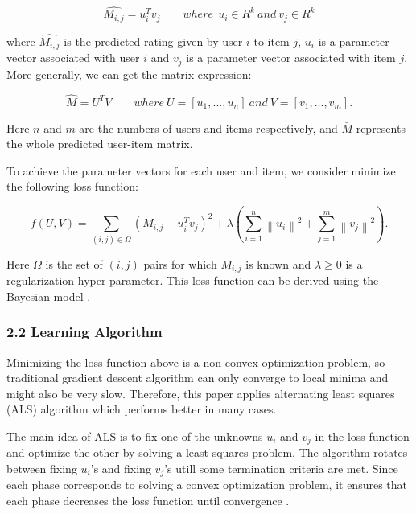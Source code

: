 \documentclass{article}
\begin{document}
\begin{equation}
	\hat{M_{i,j}}=u_{i}^{T}v_{j} \qquad where\ \ u_{i}\in R^{k}\ and\ v_{j}\in R^{k}
\end{equation}



\noindent where $\hat{M_{i,j}}$ is the predicted rating given by user $i$ to item $j$, $u_{i}$ is a parameter 
vector associated with user $i$ and $v_{j}$ is a parameter vector associated with item $j$. More generally, 
we can get the matrix expression:

\begin{equation}
	\hat{M} = U^{T}V \qquad where\ U=\left [ u_{1},...,u_{n} \right ]\ and\ V=\left [ v_{1},...,v_{m} \right ].
\end{equation}

\noindent Here $n$ and $m$ are the numbers of users and items respectively, and $\bar{M}$ represents the 
whole predicted user-item matrix.

\indent To achieve the parameter vectors for each user and item, we consider minimize the 
following loss function:

\begin{equation}
	f\left ( U,V \right )=\sum_{\left ( i,j \right )\in \Omega }^{}\left ( M_{i,j} - u_{i}^{T}v_{j}\right )^{2}+\lambda \left ( \sum_{i=1}^{n}\left \| u_{i} \right \|^{2}+\sum_{j=1}^{m}\left \| v_{j} \right \|^{2} \right ).
\end{equation}

\noindent Here $\Omega$ is the set of $\left ( i,j \right )$ pairs for which $M_{i,j}$ is known and $\lambda \geq 0$ is a 
regularization hyper-parameter. This loss function can be derived using the Bayesian model \cite{st446lecturenotes}.

\subsubsection*{2.2  Learning Algorithm}


\noindent Minimizing the loss function above is a non-convex optimization problem, so traditional 
gradient descent algorithm can only converge to local minima and might also be very slow. Therefore, 
this paper applies alternating least squares (ALS) algorithm which performs better in many cases.



\indent The main idea of ALS is to fix one of the unknowns $u_{i}$ and $v_{j}$ in the loss function 
and optimize the other by solving a least squares problem. The algorithm rotates between fixing 
$u_{i}$’s and fixing $v_{j}$’s utill some termination criteria are met. Since each phase corresponds to solving a 
convex optimization problem, it ensures that each phase decreases the loss function until convergence \cite{koren2009matrix}.
\end{document}
